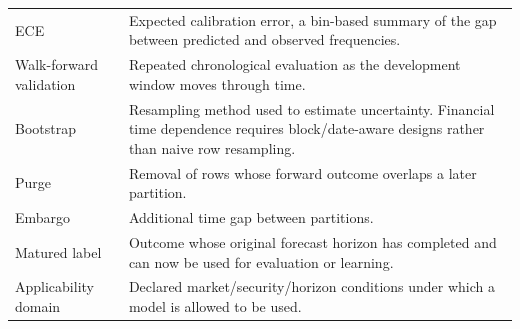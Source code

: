 \documentclass[11pt]{article}
\begin{document}
\begin{longtable}{p{}p{}}
ECE & Expected calibration error, a bin-based summary of the gap between predicted and observed frequencies.\\
Walk-forward validation & Repeated chronological evaluation as the development window moves through time.\\
Bootstrap & Resampling method used to estimate uncertainty. Financial time dependence requires block/date-aware designs rather than naive row resampling.\\
Purge & Removal of rows whose forward outcome overlaps a later partition.\\
Embargo & Additional time gap between partitions.\\
Matured label & Outcome whose original forecast horizon has completed and can now be used for evaluation or learning.\\
Applicability domain & Declared market/security/horizon conditions under which a model is allowed to be used.\\
\bottomrule
\end{longtable}
\end{document}

